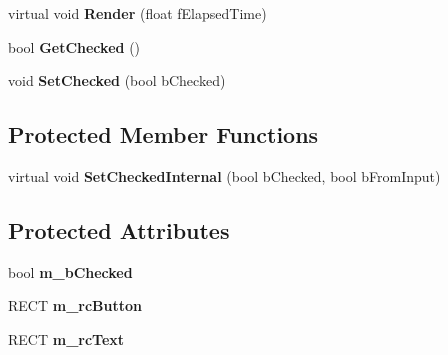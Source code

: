 \begin{DoxyCompactItemize}
\item 
\hypertarget{class_c_d_x_u_t_check_box_af9dfdc0e9f72f0747c061e3ca3022bce}{virtual void {\bfseries Render} (float f\+Elapsed\+Time)}\label{class_c_d_x_u_t_check_box_af9dfdc0e9f72f0747c061e3ca3022bce}

\item 
\hypertarget{class_c_d_x_u_t_check_box_a17449ea0718aa35b988bb6d079e36a58}{bool {\bfseries Get\+Checked} ()}\label{class_c_d_x_u_t_check_box_a17449ea0718aa35b988bb6d079e36a58}

\item 
\hypertarget{class_c_d_x_u_t_check_box_ac6fa565a1c5740f2a908746b977689a2}{void {\bfseries Set\+Checked} (bool b\+Checked)}\label{class_c_d_x_u_t_check_box_ac6fa565a1c5740f2a908746b977689a2}

\end{DoxyCompactItemize}
\subsection*{Protected Member Functions}
\begin{DoxyCompactItemize}
\item 
\hypertarget{class_c_d_x_u_t_check_box_a022d282182fef2c403b7f57ba3c81019}{virtual void {\bfseries Set\+Checked\+Internal} (bool b\+Checked, bool b\+From\+Input)}\label{class_c_d_x_u_t_check_box_a022d282182fef2c403b7f57ba3c81019}

\end{DoxyCompactItemize}
\subsection*{Protected Attributes}
\begin{DoxyCompactItemize}
\item 
\hypertarget{class_c_d_x_u_t_check_box_ac2d09bf808d218c90f013d5f0ea5cfa0}{bool {\bfseries m\+\_\+b\+Checked}}\label{class_c_d_x_u_t_check_box_ac2d09bf808d218c90f013d5f0ea5cfa0}

\item 
\hypertarget{class_c_d_x_u_t_check_box_a9629eb23cf728bccd8e5850e2e49e74d}{R\+E\+C\+T {\bfseries m\+\_\+rc\+Button}}\label{class_c_d_x_u_t_check_box_a9629eb23cf728bccd8e5850e2e49e74d}

\item 
\hypertarget{class_c_d_x_u_t_check_box_af80193c178d600a91d9a8a53b1f852c7}{R\+E\+C\+T {\bfseries m\+\_\+rc\+Text}}\label{class_c_d_x_u_t_check_box_af80193c178d600a91d9a8a53b1f852c7}

\end{DoxyCompactItemize}
